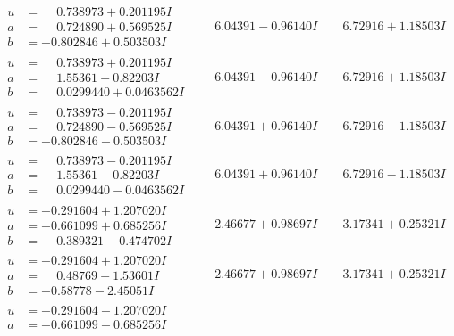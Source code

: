 \documentclass[1p]{elsarticle_modified}
\theoremstyle{definition}
\begin{document}
$$\begin{array}{c|c|c}
\begin{aligned}
u &= \phantom{-}0.738973 + 0.201195 I \\
a &= \phantom{-}0.724890 + 0.569525 I \\
b &= -0.802846 + 0.503503 I\end{aligned}
 & \phantom{-}6.04391 - 0.96140 I & \phantom{-}6.72916 + 1.18503 I \\ \hline\begin{aligned}
u &= \phantom{-}0.738973 + 0.201195 I \\
a &= \phantom{-}1.55361 - 0.82203 I \\
b &= \phantom{-}0.0299440 + 0.0463562 I\end{aligned}
 & \phantom{-}6.04391 - 0.96140 I & \phantom{-}6.72916 + 1.18503 I \\ \hline\begin{aligned}
u &= \phantom{-}0.738973 - 0.201195 I \\
a &= \phantom{-}0.724890 - 0.569525 I \\
b &= -0.802846 - 0.503503 I\end{aligned}
 & \phantom{-}6.04391 + 0.96140 I & \phantom{-}6.72916 - 1.18503 I \\ \hline\begin{aligned}
u &= \phantom{-}0.738973 - 0.201195 I \\
a &= \phantom{-}1.55361 + 0.82203 I \\
b &= \phantom{-}0.0299440 - 0.0463562 I\end{aligned}
 & \phantom{-}6.04391 + 0.96140 I & \phantom{-}6.72916 - 1.18503 I \\ \hline\begin{aligned}
u &= -0.291604 + 1.207020 I \\
a &= -0.661099 + 0.685256 I \\
b &= \phantom{-}0.389321 - 0.474702 I\end{aligned}
 & \phantom{-}2.46677 + 0.98697 I & \phantom{-}3.17341 + 0.25321 I \\ \hline\begin{aligned}
u &= -0.291604 + 1.207020 I \\
a &= \phantom{-}0.48769 + 1.53601 I \\
b &= -0.58778 - 2.45051 I\end{aligned}
 & \phantom{-}2.46677 + 0.98697 I & \phantom{-}3.17341 + 0.25321 I \\ \hline\begin{aligned}
u &= -0.291604 - 1.207020 I \\
a &= -0.661099 - 0.685256 I \\

\end{aligned}
\end{array}$$
\end{document}
